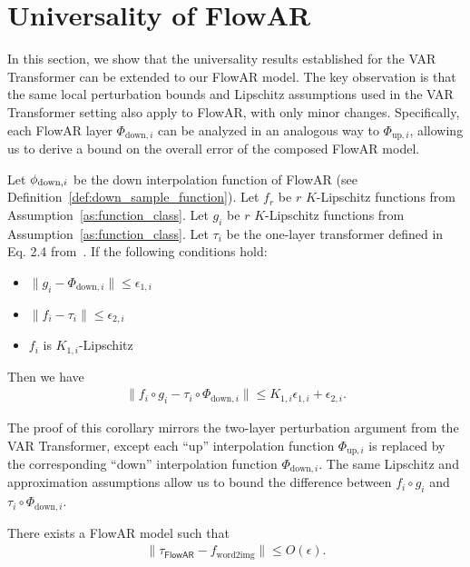 
\section{Universality of FlowAR}\label{sec:flowar_universality}

In this section, we show that the universality results established for the VAR Transformer can be extended to our FlowAR model. The key observation is that the same local perturbation bounds and Lipschitz assumptions used in the VAR Transformer setting also apply to FlowAR, with only minor changes. Specifically, each FlowAR layer $\Phi_{\mathrm{down}, i}$ can be analyzed in an analogous way to $\Phi_{\mathrm{up}, i}$, allowing us to derive a bound on the overall error of the composed FlowAR model.

\begin{corollary}
    Let $\phi_{{\rm down},i}$ be the down interpolation function of FlowAR (see Definition~\ref{def:down_sample_function}). Let $f_r$ be $r$ $K$-Lipschitz functions from Assumption~\ref{as:function_class}. Let $g_i$ be $r$ $K$-Lipschitz functions from Assumption~\ref{as:function_class}. Let $\tau_i$ be the one-layer transformer defined in Eq. 2.4 from~\cite{hwg+24}. 
    If the following conditions hold: 
    \begin{itemize}
        \item $\|g_i - \Phi_{\mathrm{down},i}\| \leq \epsilon_{1,i}$
        \item $\|f_i - \tau_i\| \leq \epsilon_{2,i}$
        \item $f_i$ is $K_{1,i}$-Lipschitz
        
    \end{itemize}
    Then we have
    \begin{align*}
        \|f_i \circ g_i - \tau_i \circ \Phi_{\mathrm{down},i}\| \leq K_{1,i} \epsilon_{1,i} + \epsilon_{2,i}.
    \end{align*}
\end{corollary}

The proof of this corollary mirrors the two-layer perturbation argument from the VAR Transformer, except each ``up'' interpolation function $\Phi_{\mathrm{up},i}$ is replaced by the corresponding ``down'' interpolation function $\Phi_{\mathrm{down},i}$. The same Lipschitz and approximation assumptions allow us to bound the difference between $f_i \circ g_i$ and $\tau_i \circ \Phi_{\mathrm{down},i}$.

\begin{corollary}\label{corollary:flowar_universality}
    There exists a FlowAR model such that
    \begin{align*}
        \| \tau_{\mathsf{FlowAR}} - f_{\mathrm{word2img}} \| \leq O(\epsilon).
    \end{align*}
\end{corollary}

